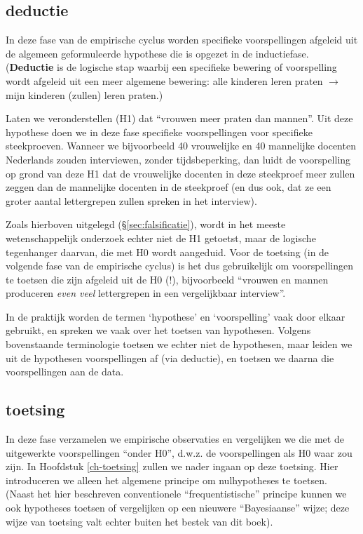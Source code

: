 \documentclass[
]{book}
\begin{document}
\subsection{deductie}\label{deductie}

In deze fase van de empirische cyclus worden specifieke voorspellingen
afgeleid uit de algemeen geformuleerde hypothese die is opgezet in de
inductiefase. (\textbf{Deductie} is de logische stap waarbij een specifieke
bewering of voorspelling wordt afgeleid uit een meer algemene bewering:
alle kinderen leren praten \(\rightarrow\) mijn kinderen (zullen) leren
praten.)

Laten we veronderstellen (H1) dat ``vrouwen meer praten dan mannen''. Uit
deze hypothese doen we in deze fase specifieke voorspellingen voor
specifieke steekproeven. Wanneer we bijvoorbeeld 40 vrouwelijke en 40
mannelijke docenten Nederlands zouden interviewen, zonder
tijdsbeperking, dan luidt de voorspelling op grond van deze H1 dat de
vrouwelijke docenten in deze steekproef meer zullen zeggen dan de
mannelijke docenten in de steekproef (en dus ook, dat ze een groter
aantal lettergrepen zullen spreken in het interview).

Zoals hierboven uitgelegd (§\ref{sec:falsificatie}), wordt in het meeste wetenschappelijk
onderzoek echter niet de H1 getoetst, maar de logische tegenhanger
daarvan, die met H0 wordt aangeduid.
Voor de toetsing (in de volgende fase van de empirische
cyclus) is het dus gebruikelijk om voorspellingen te toetsen die zijn
afgeleid uit de H0 (!), bijvoorbeeld ``vrouwen en mannen produceren \emph{even veel} lettergrepen in een vergelijkbaar interview''.

In de praktijk worden de termen `hypothese' en `voorspelling' vaak door
elkaar gebruikt, en spreken we vaak over het toetsen van hypothesen.
Volgens bovenstaande terminologie toetsen we echter niet de hypothesen, maar leiden we uit de hypothesen voorspellingen af (via deductie), en toetsen we daarna die voorspellingen aan de data.

\subsection{toetsing}\label{toetsing}

In deze fase verzamelen we empirische observaties en vergelijken we die
met de uitgewerkte voorspellingen ``onder H0'', d.w.z. de voorspellingen
als H0 waar zou zijn. In Hoofdstuk \ref{ch-toetsing} zullen we nader ingaan op deze toetsing. Hier introduceren we alleen het algemene principe om nulhypotheses te toetsen. (Naast het hier beschreven conventionele ``frequentistische'' principe kunnen we ook hypotheses toetsen of vergelijken op een nieuwere ``Bayesiaanse'' wijze; deze wijze van toetsing valt echter buiten het bestek van dit boek).
\end{document}
